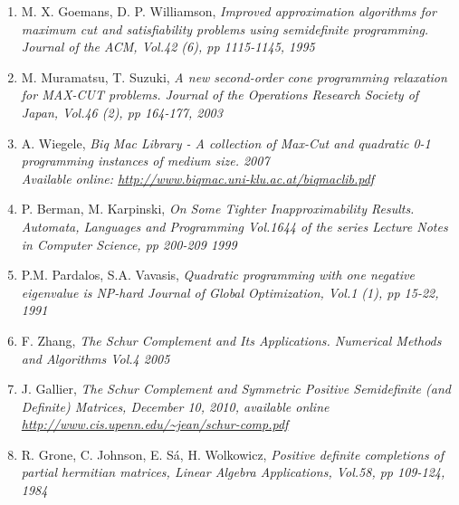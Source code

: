 \documentclass[12pt]{book}
\theoremstyle{definition}
\begin{document}
\begin{enumerate}


\item M. X. Goemans, D. P. Williamson, \it Improved approximation algorithms for maximum cut and satisfiability problems using semidefinite programming. \rm Journal of the ACM, Vol.42 (6), pp 1115-1145, 1995
\label{GoemansWilliamsonMaxCut}
%
\item M. Muramatsu,  T. Suzuki, \it A new second-order cone programming relaxation for MAX-CUT problems. \rm Journal of the Operations Research
Society of Japan, Vol.46 (2), pp 164-177, 2003
\label{MuramatsuSuzukiANewSOCPrelaxForMaxCut}
%
\item A. Wiegele, \it Biq Mac Library - A collection of Max-Cut and
quadratic 0-1 programming instances of medium size. \rm 2007 \\
Available online: \url{http://www.biqmac.uni-klu.ac.at/biqmaclib.pdf}
\label{BiqMacLib}

	








%
\item P. Berman, M. Karpinski, \it On Some Tighter Inapproximability Results. \rm Automata, Languages and Programming
Vol.1644 of the series Lecture Notes in Computer Science, pp 200-209 1999
\label{Inapproximability results}
%
\item P.M. Pardalos, S.A. Vavasis, \it Quadratic programming with one negative eigenvalue is NP-hard \rm Journal of Global Optimization, Vol.1 (1), pp 15-22, 1991
\label{PardalosQPisNPHard}
%
\item F. Zhang, \it The Schur Complement and Its Applications. \rm
Numerical Methods and Algorithms Vol.4 2005
\label{ZhangSchurComplement}
%
\item J. Gallier, \it The Schur Complement and Symmetric Positive Semidefinite (and Definite) Matrices, \rm December 10, 2010, available online \url{http://www.cis.upenn.edu/~jean/schur-comp.pdf}
\label{GallierSchurCompl}
%
\item R. Grone, C. Johnson, E. Sá, H. Wolkowicz, \it Positive definite completions of partial hermitian matrices, \rm 
Linear Algebra Applications, Vol.58, pp 109-124, 1984
\label{GronePSDcompletions}



\end{enumerate}
\end{document}
